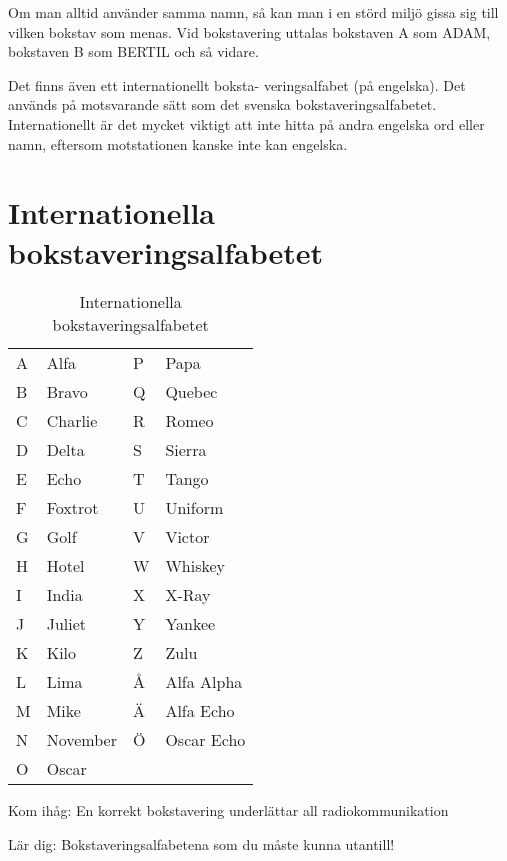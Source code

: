 Om man alltid använder samma namn, så kan man i en störd miljö gissa
sig till vilken bokstav som menas. Vid bokstavering uttalas bokstaven
A som ADAM, bokstaven B som BERTIL och så vidare.

Det finns även ett internationellt boksta- veringsalfabet (på
engelska). Det används på motsvarande sätt som det svenska
bokstaveringsalfabetet. Internationellt är det mycket viktigt att inte
hitta på andra engelska ord eller namn, eftersom motstationen kanske
inte kan engelska.

\section{Internationella bokstaveringsalfabetet}

\begin{table}[h]
  \begin{tabular}{ll|ll}
    A & Alfa     & P & Papa  \\
    B & Bravo    & Q & Quebec\\
    C & Charlie  & R & Romeo\\
    D & Delta    & S & Sierra\\
    E & Echo     & T & Tango\\
    F & Foxtrot  & U & Uniform\\
    G & Golf     & V & Victor\\
    H & Hotel    & W & Whiskey \\
    I & India    & X & X-Ray\\
    J & Juliet   & Y & Yankee\\
    K & Kilo     & Z & Zulu\\
    L & Lima     & Å & Alfa Alpha\\
    M & Mike     & Ä & Alfa Echo\\
    N & November & Ö & Oscar Echo\\
    O & Oscar    & & \\
  \end{tabular}
  \caption{Internationella bokstaveringsalfabetet}
  \label{tab:int-bokstavering}
\end{table}

Kom ihåg: En korrekt bokstavering underlättar all radiokommunikation

Lär dig: Bokstaveringsalfabetena som du måste kunna utantill!

